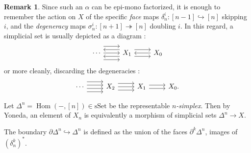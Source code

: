 \documentclass[11pt]{article}
\theoremstyle{definition}
\newtheorem{remark}{Remark}
\newcommand{\sSet}{\mathrm{sSet}}
\DeclareMathOperator{\Hom}{Hom}
\begin{document}
\begin{remark}
    Since such an $\alpha$ can be epi-mono factorized, it is enough to remember the action on $X$ of the specific \emph{face} maps $\delta_n^i : [n-1] \hookrightarrow [n]$ skipping $i$, and the \emph{degeneracy} maps $\sigma_n^i : [n+1] \twoheadrightarrow [n]$ doubling $i$. In this regard, a simplicial set is usually depicted as a diagram :
    \[\begin{tikzcd}
        \cdots & {X_1} & {X_0}
        \arrow[from=1-1, to=1-2]
        \arrow[shift right=4, from=1-1, to=1-2]
        \arrow[shift left=4, from=1-1, to=1-2]
        \arrow[shift left=2, from=1-2, to=1-1]
        \arrow[shift right=2, from=1-2, to=1-1]
        \arrow[shift left=2, from=1-2, to=1-3]
        \arrow[shift right=2, from=1-2, to=1-3]
        \arrow[from=1-3, to=1-2]
    \end{tikzcd}\]
    or more cleanly, discarding the degeneracies :
    \[\begin{tikzcd}
        \cdots & {X_2} & {X_1} & {X_0.}
        \arrow[shift left, from=1-1, to=1-2]
        \arrow[shift left=3, from=1-1, to=1-2]
        \arrow[shift right, from=1-1, to=1-2]
        \arrow[shift right=3, from=1-1, to=1-2]
        \arrow[from=1-2, to=1-3]
        \arrow[shift left=2, from=1-2, to=1-3]
        \arrow[shift right=2, from=1-2, to=1-3]
        \arrow[shift left, from=1-3, to=1-4]
        \arrow[shift right, from=1-3, to=1-4]
    \end{tikzcd}\]
\end{remark}

Let $\Delta^n = \Hom(-, [n]) \in \sSet$ be the representable \emph{$n$-simplex}. Then by Yoneda, an element of $X_n$ is equivalently a morphism of simplicial sets $\Delta^n \to X$.

The boundary $\partial \Delta^n \hookrightarrow \Delta^n$ is defined as the union of the faces $\partial^k \Delta^n$, images of $(\delta_n^k)^*$.
\end{document}
